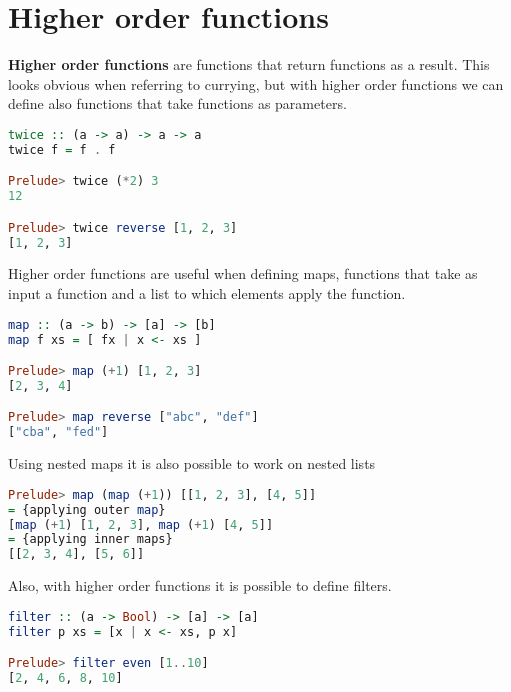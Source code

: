 \section{Higher order functions}
\textbf{Higher order functions} are functions that return functions as a result. This looks obvious when referring to currying, but with higher order functions we can define also functions that take functions as parameters. 

\begin{lstlisting}[language=haskell]
twice :: (a -> a) -> a -> a
twice f = f . f

Prelude> twice (*2) 3
12

Prelude> twice reverse [1, 2, 3]
[1, 2, 3]
\end{lstlisting}

Higher order functions are useful when defining maps, functions that take as input a function and a list to which elements apply the function. 

\begin{lstlisting}[language=haskell]
map :: (a -> b) -> [a] -> [b]
map f xs = [ fx | x <- xs ]

Prelude> map (+1) [1, 2, 3]
[2, 3, 4]

Prelude> map reverse ["abc", "def"] 
["cba", "fed"]
\end{lstlisting}

Using nested maps it is also possible to work on nested lists

\begin{lstlisting}[language=haskell]
Prelude> map (map (+1)) [[1, 2, 3], [4, 5]]
= {applying outer map}
[map (+1) [1, 2, 3], map (+1) [4, 5]]
= {applying inner maps} 
[[2, 3, 4], [5, 6]]
\end{lstlisting}

Also, with higher order functions it is possible to define filters.

\begin{lstlisting}[language=haskell]
filter :: (a -> Bool) -> [a] -> [a]
filter p xs = [x | x <- xs, p x]

Prelude> filter even [1..10]
[2, 4, 6, 8, 10]
\end{lstlisting}
